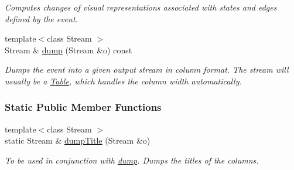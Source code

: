 \begin{DoxyCompactItemize}
\begin{DoxyCompactList}\small\item\em Computes changes of visual representations associated with states and edges defined by the event. \end{DoxyCompactList}\item 
{\footnotesize template$<$class Stream $>$ }\\Stream \& \hyperlink{structEventBase_a9665ffd5641260188e52cad91aaa50bd}{dump} (Stream \&o) const 
\begin{DoxyCompactList}\small\item\em Dumps the event into a given output stream in column format. The stream will usually be a \hyperlink{structTable}{Table}, which handles the column width automatically. \end{DoxyCompactList}\end{DoxyCompactItemize}
\subsubsection*{Static Public Member Functions}
\begin{DoxyCompactItemize}
\item 
{\footnotesize template$<$class Stream $>$ }\\static Stream \& \hyperlink{structEventBase_ae40709d77b7e7ee3021393948bedcb40}{dump\+Title} (Stream \&o)
\begin{DoxyCompactList}\small\item\em To be used in conjunction with \hyperlink{structEventBase_a9665ffd5641260188e52cad91aaa50bd}{dump}. Dumps the titles of the columns. \end{DoxyCompactList}\end{DoxyCompactItemize}
